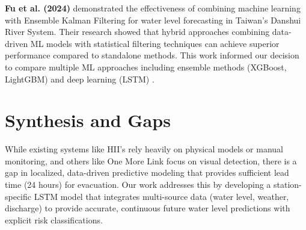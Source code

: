 \textbf{Fu et al. (2024)} demonstrated the effectiveness of combining machine learning with Ensemble Kalman Filtering for water level forecasting in Taiwan's Danshui River System. Their research showed that hybrid approaches combining data-driven ML models with statistical filtering techniques can achieve superior performance compared to standalone methods. This work informed our decision to compare multiple ML approaches including ensemble methods (XGBoost, LightGBM) and deep learning (LSTM) \cite{fu2024water}.

\section{Synthesis and Gaps}

While existing systems like HII's rely heavily on physical models or manual monitoring, and others like One More Link focus on visual detection, there is a gap in localized, data-driven predictive modeling that provides sufficient lead time (24 hours) for evacuation. Our work addresses this by developing a station-specific LSTM model that integrates multi-source data (water level, weather, discharge) to provide accurate, continuous future water level predictions with explicit risk classifications.
